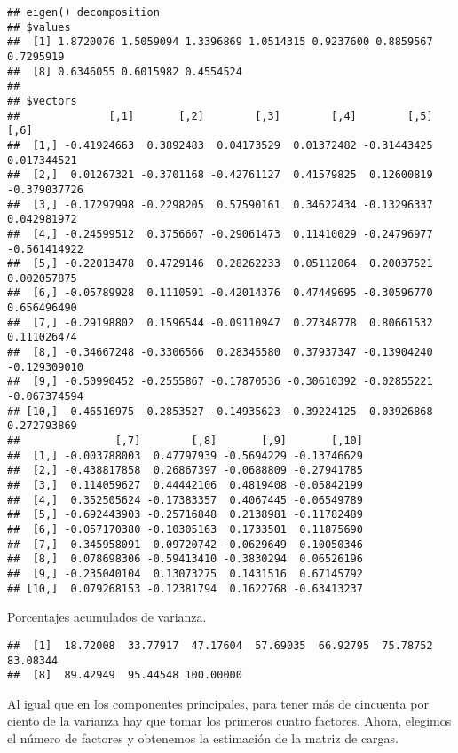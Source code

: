 \documentclass[
]{article}
\newenvironment{Shaded}{\begin{snugshade}}{\end{snugshade}}
\newcommand{\DecValTok}[1]{\textcolor[rgb]{0.00,0.00,0.81}{#1}}
\newcommand{\FunctionTok}[1]{\textcolor[rgb]{0.00,0.00,0.00}{#1}}
\newcommand{\NormalTok}[1]{#1}
\newcommand{\SpecialCharTok}[1]{\textcolor[rgb]{0.00,0.00,0.00}{#1}}
\begin{document}
\begin{verbatim}
## eigen() decomposition
## $values
##  [1] 1.8720076 1.5059094 1.3396869 1.0514315 0.9237600 0.8859567 0.7295919
##  [8] 0.6346055 0.6015982 0.4554524
## 
## $vectors
##              [,1]       [,2]        [,3]        [,4]        [,5]         [,6]
##  [1,] -0.41924663  0.3892483  0.04173529  0.01372482 -0.31443425  0.017344521
##  [2,]  0.01267321 -0.3701168 -0.42761127  0.41579825  0.12600819 -0.379037726
##  [3,] -0.17297998 -0.2298205  0.57590161  0.34622434 -0.13296337  0.042981972
##  [4,] -0.24599512  0.3756667 -0.29061473  0.11410029 -0.24796977 -0.561414922
##  [5,] -0.22013478  0.4729146  0.28262233  0.05112064  0.20037521  0.002057875
##  [6,] -0.05789928  0.1110591 -0.42014376  0.47449695 -0.30596770  0.656496490
##  [7,] -0.29198802  0.1596544 -0.09110947  0.27348778  0.80661532  0.111026474
##  [8,] -0.34667248 -0.3306566  0.28345580  0.37937347 -0.13904240 -0.129309010
##  [9,] -0.50990452 -0.2555867 -0.17870536 -0.30610392 -0.02855221 -0.067374594
## [10,] -0.46516975 -0.2853527 -0.14935623 -0.39224125  0.03926868  0.272793869
##               [,7]        [,8]       [,9]       [,10]
##  [1,] -0.003788003  0.47797939 -0.5694229 -0.13746629
##  [2,] -0.438817858  0.26867397 -0.0688809 -0.27941785
##  [3,]  0.114059627  0.44442106  0.4819408 -0.05842199
##  [4,]  0.352505624 -0.17383357  0.4067445 -0.06549789
##  [5,] -0.692443903 -0.25716848  0.2138981 -0.11782489
##  [6,] -0.057170380 -0.10305163  0.1733501  0.11875690
##  [7,]  0.345958091  0.09720742 -0.0629649  0.10050346
##  [8,]  0.078698306 -0.59413410 -0.3830294  0.06526196
##  [9,] -0.235040104  0.13073275  0.1431516  0.67145792
## [10,]  0.079268153 -0.12381794  0.1622768 -0.63413237
\end{verbatim}

Porcentajes acumulados de varianza.

\begin{Shaded}
\end{Shaded}

\begin{verbatim}
##  [1]  18.72008  33.77917  47.17604  57.69035  66.92795  75.78752  83.08344
##  [8]  89.42949  95.44548 100.00000
\end{verbatim}

Al igual que en los componentes principales, para tener más de cincuenta
por ciento de la varianza hay que tomar los primeros cuatro factores.
Ahora, elegimos el número de factores y obtenemos la estimación de la
matriz de cargas.
\end{document}
